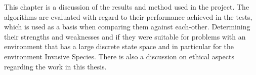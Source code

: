 This chapter is a discussion of the results and method used in the project. The algorithms are evaluated with regard to their performance achieved in the tests, which is used as a basis when comparing them against each-other. Determining their strengths and weaknesses and if they were suitable for problems with an environment that has a large discrete state space and in particular for the environment Invasive Species. There is also a discussion on ethical aspects regarding the work in this thesis.





